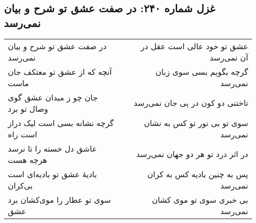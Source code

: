 \begin{center}
\section*{غزل شماره ۲۴۰: در صفت عشق تو شرح و بیان نمی‌رسد}
\label{sec:240}
\begin{longtable}{l p{0.5cm} r}
در صفت عشق تو شرح و بیان نمی‌رسد
&&
عشق تو خود عالی است عقل در آن نمی‌رسد
\\
آنچه که از عشق تو معتکف جان ماست
&&
گرچه بگویم بسی سوی زبان نمی‌رسد
\\
جان چو ز میدان عشق گوی وصال تو برد
&&
تاختنی دو کون در پی جان نمی‌رسد
\\
گرچه نشانه بسی است لیک دراز است راه
&&
سوی تو بی نور تو کس به نشان نمی‌رسد
\\
عاشق دل خسته را تا نرسد هرچه هست
&&
در اثر درد تو هر دو جهان نمی‌رسد
\\
بادیهٔ عشق تو بادیه‌ای است بی‌کران
&&
پس به چنین بادیه کس به کران نمی‌رسد
\\
سوی تو عطار را موی‌کشان برد عشق
&&
بی خبری سوی تو موی کشان نمی‌رسد
\\
\end{longtable}
\end{center}
